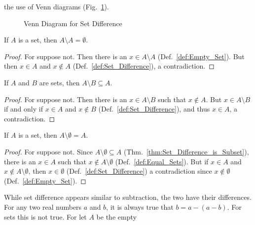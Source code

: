        the use of Venn diagrams (Fig.~\ref{fig:Set_Diff_Venn_Diagram}).
        \begin{figure}[H]
            \centering
            \captionsetup{type=figure}
            
            \caption{Venn Diagram for Set Difference}
            \label{fig:Set_Diff_Venn_Diagram}
        \end{figure} 
        \begin{theorem}
            \label{thm:Set_Difference_of_Set_with_Self}%
            If $A$ is a set, then $A\setminus{A}=\emptyset$.
        \end{theorem}
        \begin{proof}
            For suppose not. Then there is an $x\in{A}\setminus{A}$
            (Def.~\ref{def:Empty_Set}). But then $x\in{A}$ and $x\notin{A}$
            (Def.~\ref{def:Set_Difference}), a contradiction.
        \end{proof}
        \begin{theorem}
            \label{thm:Set_Difference_is_Subset}%
            If $A$ and $B$ are sets, then $A\setminus{B}\subseteq{A}$.
        \end{theorem}
        \begin{proof}
            For suppose not. Then there is an $x\in{A}\setminus{B}$ such that
            $x\notin{A}$. But $x\in{A}\setminus{B}$ if and only if $x\in{A}$ and
            $x\notin{B}$ (Def.~\ref{def:Set_Difference}), and thus $x\in{A}$, a
            contradiction.
        \end{proof}
        \begin{theorem}
            \label{thm:Set_Difference_of_Set_and_Empty}%
            If $A$ is a set, then $A\setminus\emptyset=A$.
        \end{theorem}
        \begin{proof}
            For suppose not. Since $A\setminus\emptyset\subseteq{A}$
            (Thm.~\ref{thm:Set_Difference_is_Subset}), there is an $x\in{A}$
            such that $x\notin{A}\setminus\emptyset$
            (Def.~\ref{def:Equal_Sets}). But if $x\in{A}$ and
            $x\notin{A}\setminus\emptyset$, then $x\in\emptyset$
            (Def.~\ref{def:Set_Difference}) a contradiction since
            $x\notin\emptyset$ (Def.~\ref{def:Empty_Set}).
        \end{proof}
        While set difference appears similar to subtraction, the two have their
        differences. For any two real numbers $a$ and $b$, it is always true
        that $b=a-(a-b)$. For sets this is not true. For let $A$ be the empty
